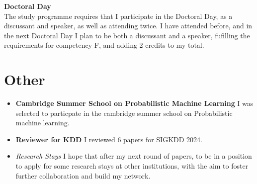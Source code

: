 \textbf{Doctoral Day} \\
The study programme requires that I participate in the Doctoral Day, as a discussant and speaker, as well as
attending twice. I have attended before, and in the next Doctoral Day I plan to be both a discussant and a speaker,
fufilling the requirements for competency F, and adding 2 credits to my total.

\section{Other}

\begin{itemize}
    \item \textbf{Cambridge Summer School on Probabilistic Machine Learning} I was selected to particpate in the
    cambridge summer school on Probabilistic machine learning.
    \item \textbf{Reviewer for KDD} I reviewed 6 papers for SIGKDD 2024.
    \item \textit{Research Stays} I hope that after my next round of papers, to be in a position to apply for some
    research stays at other institutions, with the aim to foster further collaboration and build my network.
\end{itemize}


